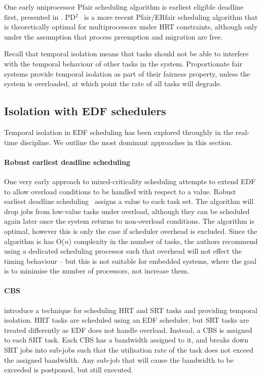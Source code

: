 One early uniprocessor Pfair scheduling algorithm is earliest eligible deadline first, presented in \citet{Stoica_AKBGP_96}.
PD$^{2}$~\citep{Srinivasan_Anderson_06} is a more recent Pfair/ERfair scheduling algorithm that is theoretically optimal for multiprocessors under \gls{HRT} constraints, although only under the assumption that process preemption and migration are free.

Recall that temporal isolation means that tasks should not be able to interfere with the temporal behaviour of other tasks in the system.
Proportionate fair systems provide temporal isolation as part of their fairness property, unless the system is overloaded, at which point the rate of all tasks will degrade.

\subsection{Isolation with EDF schedulers}

Temporal isolation in \gls{EDF} scheduling has been explored throughly in the real-time discipline.
We outline the most dominant approaches in this section.

\paragraph{Robust earliest deadline scheduling}
One very early approach to mixed-criticality scheduling attempts to extend \gls{EDF} to allow overload conditions to be handled with respect to a value. Robust earliest deadline scheduling~\citep{Buttazzo_Stankovic_93} assigns a value to each task set.
The algorithm will drop jobs from low-value tasks under overload, although they can be scheduled again later once the system returns to non-overload conditions.
The algorithm is optimal, however this is only the case if scheduler overhead is excluded.
Since the algorithm is has O($n$) complexity in the number of tasks, the authors recommend using a dedicated scheduling processor such that overhead will not effect the timing behaviour -- but this is not suitable for embedded systems, where the goal is to minimise the number of processors, not increase them.

\paragraph{\gls{CBS}} \citet{Abeni_Buttazzo_04} introduce a technique for scheduling \gls{HRT} and \gls{SRT} tasks and providing temporal isolation.
\gls{HRT} tasks are scheduled using an \gls{EDF} scheduler, but \gls{SRT} tasks are treated differently as \gls{EDF} does not handle overload.
Instead, a \gls{CBS} is assigned to each \gls{SRT} task.
Each \gls{CBS} has a bandwidth assigned to it, and breaks down \gls{SRT} jobs into sub-jobs such that the utilisation rate of the task does not exceed the assigned bandwidth.
Any sub-job that will cause the bandwidth to be exceeded is postponed, but still executed.

